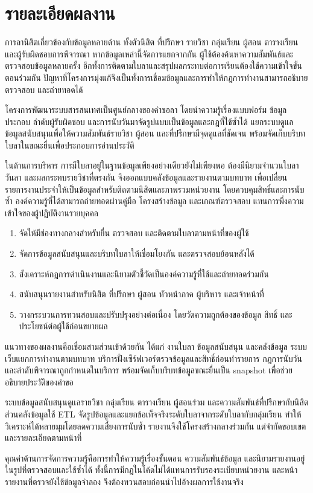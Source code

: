 \section*{รายละเอียดผลงาน}
การลานิสิตเกี่ยวข้องกับข้อมูลหลายด้าน ทั้งตัวนิสิต ที่ปรึกษา รายวิชา กลุ่มเรียน ผู้สอน ตารางเรียน และผู้รับผิดชอบการพิจารณา หากข้อมูลเหล่านี้จัดการแยกจากกัน ผู้ใช้ต้องค้นหาความสัมพันธ์และตรวจสอบข้อมูลหลายครั้ง อีกทั้งการติดตามใบลาและสรุปผลกระทบต่อการเรียนต้องใช้ความเข้าใจขั้นตอนร่วมกัน ปัญหาที่โครงการมุ่งแก้จึงเป็นทั้งการเชื่อมข้อมูลและการทำให้กฎการทำงานสามารถอธิบาย ตรวจสอบ และถ่ายทอดได้

โครงการพัฒนาระบบสารสนเทศเป็นศูนย์กลางของคำขอลา โดยนำความรู้เรื่องแบบฟอร์ม ข้อมูลประกอบ ลำดับผู้รับผิดชอบ และการนับวันมาจัดรูปแบบเป็นข้อมูลและกฎที่ใช้ซ้ำได้ แยกระบบดูแลข้อมูลสนับสนุนเพื่อให้ความสัมพันธ์รายวิชา ผู้สอน และที่ปรึกษามีจุดดูแลที่ชัดเจน พร้อมจัดเก็บบริบทใบลาในขณะยื่นเพื่อประกอบการอ่านประวัติ

ในด้านการบริหาร การมีใบลาอยู่ในฐานข้อมูลเพียงอย่างเดียวยังไม่เพียงพอ ต้องมีนิยามจำนวนใบลา วันลา และผลกระทบรายวิชาที่ตรงกัน จึงออกแบบคลังข้อมูลและรายงานตามบทบาท เพื่อเปลี่ยนรายการงานประจำให้เป็นข้อมูลสำหรับติดตามนิสิตและภาพรวมหน่วยงาน โดยควบคุมสิทธิ์และการนับซ้ำ องค์ความรู้ที่ได้สามารถถ่ายทอดผ่านคู่มือ โครงสร้างข้อมูล และเกณฑ์ตรวจสอบ แทนการพึ่งความเข้าใจของผู้ปฏิบัติงานรายบุคคล

\begin{enumerate}[leftmargin=8mm]
  \item จัดให้มีช่องทางกลางสำหรับยื่น ตรวจสอบ และติดตามใบลาตามหน้าที่ของผู้ใช้
  \item จัดการข้อมูลสนับสนุนและบริบทใบลาให้เชื่อมโยงกัน และตรวจสอบย้อนหลังได้
  \item สังเคราะห์กฎการดำเนินงานและนิยามตัวชี้วัดเป็นองค์ความรู้ที่ใช้และถ่ายทอดร่วมกัน
  \item สนับสนุนรายงานสำหรับนิสิต ที่ปรึกษา ผู้สอน หัวหน้าภาค ผู้บริหาร และเจ้าหน้าที่
  \item วางกระบวนการทวนสอบและปรับปรุงอย่างต่อเนื่อง โดยวัดความถูกต้องของข้อมูล สิทธิ์ และประโยชน์ต่อผู้ใช้ก่อนขยายผล
\end{enumerate}

แนวทางของผลงานคือเชื่อมสามส่วนเข้าด้วยกัน ได้แก่ งานใบลา ข้อมูลสนับสนุน และคลังข้อมูล ระบบเว็บแยกการทำงานตามบทบาท บริการฝั่งเซิร์ฟเวอร์ตรวจข้อมูลและสิทธิ์ก่อนทำรายการ กฎการนับวันและลำดับพิจารณาถูกกำหนดในบริการ พร้อมจัดเก็บบริบทข้อมูลขณะยื่นเป็น snapshot เพื่อช่วยอธิบายประวัติของคำขอ

ระบบข้อมูลสนับสนุนดูแลรายวิชา กลุ่มเรียน ตารางเรียน ผู้สอนร่วม และความสัมพันธ์ที่ปรึกษากับนิสิต ส่วนคลังข้อมูลใช้ ETL จัดรูปข้อมูลและแยกข้อเท็จจริงระดับใบลาจากระดับใบลากับกลุ่มเรียน ทำให้วิเคราะห์ได้หลายมุมโดยลดความเสี่ยงการนับซ้ำ รายงานจึงใช้โครงสร้างกลางร่วมกัน แต่จำกัดขอบเขตและรายละเอียดตามหน้าที่

คุณค่าด้านการจัดการความรู้คือการทำให้ความรู้เรื่องขั้นตอน ความสัมพันธ์ข้อมูล และนิยามรายงานอยู่ในรูปที่ตรวจสอบและใช้ซ้ำได้ ทั้งนี้การมีกฎในโค้ดไม่ได้แทนการรับรองระเบียบหน่วยงาน และหน้ารายงานที่ตรวจยังใช้ข้อมูลจำลอง จึงต้องทวนสอบก่อนนำไปอ้างผลการใช้งานจริง

